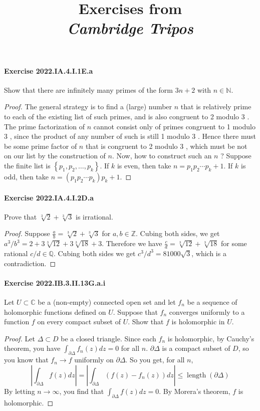 \documentclass{article}
\title{\textbf{
Exercises from \\
\textit{Cambridge Tripos}
}}
\date{}
\begin{document}
\maketitle


\paragraph{Exercise 2022.IA.4.I.1E.a} Show that there are infinitely many primes of the form $3 n+2$ with $n \in \mathbb{N}$.
\begin{proof}
    The general strategy is to find a (large) number $n$ that is relatively prime to each of the existing list of such primes, and is also congruent to 2 modulo 3 . The prime factorization of $n$ cannot consist only of primes congruent to 1 modulo 3 , since the product of any number of such is still 1 modulo 3 . Hence there must be some prime factor of $n$ that is congruent to 2 modulo 3 , which must be not on our list by the construction of $n$.
Now, how to construct such an $n$ ? Suppose the finite list is $\left\{p_1, p_2, \ldots, p_k\right\}$. If $k$ is even, then take $n=p_1 p_2 \cdots p_k+1$. If $k$ is odd, then take $n=\left(p_1 p_2 \cdots p_k\right) p_k+1$.
\end{proof}


\paragraph{Exercise 2022.IA.4.I.2D.a} Prove that $\sqrt[3]{2}+\sqrt[3]{3}$ is irrational.
\begin{proof}
    Suppose $\frac{a}{b} = \sqrt[3]{2}+\sqrt[3]{3}$ for $a,b\in\mathbb{Z}$. Cubing both sides, we get $a^3/b^3 = 2 + 3 \sqrt[3]{12} + 3\sqrt[3]{18}+3$. Therefore we have $\frac{c}{d} = \sqrt[3]{12} + \sqrt[3]{18}$ for some rational $c/d\in\mathbb{Q}$. Cubing both sides we get $c^3/d^3 = 81000\sqrt{3}$, which is a contradiction.
\end{proof}


\paragraph{Exercise 2022.IB.3.II.13G.a.i} Let $U \subset \mathbb{C}$ be a (non-empty) connected open set and let $f_n$ be a sequence of holomorphic functions defined on $U$. Suppose that $f_n$ converges uniformly to a function $f$ on every compact subset of $U$. Show that $f$ is holomorphic in $U$.
\begin{proof}
    Let $\Delta \subset D$ be a closed triangle. Since each $f_n$ is holomorphic, by Cauchy's theorem, you have $\int_{\partial \Delta} f_n(z) d z=0$ for all $n$.
$\partial \Delta$ is a compact subset of $D$, so you know that $f_n \rightarrow f$ uniformly on $\partial \Delta$.
So you get, for all $n$,
$$
\left|\int_{\partial \Delta} f(z) d z\right|=\left|\int_{\partial \Delta}\left(f(z)-f_n(z)\right) d z\right| \leq \operatorname{length}(\partial \Delta)
$$
By letting $n \rightarrow \infty$, you find that $\int_{\partial \Delta} f(z) d z=0$.
By Morera's theorem, $f$ is holomorphic.
\end{proof}
\end{document}

